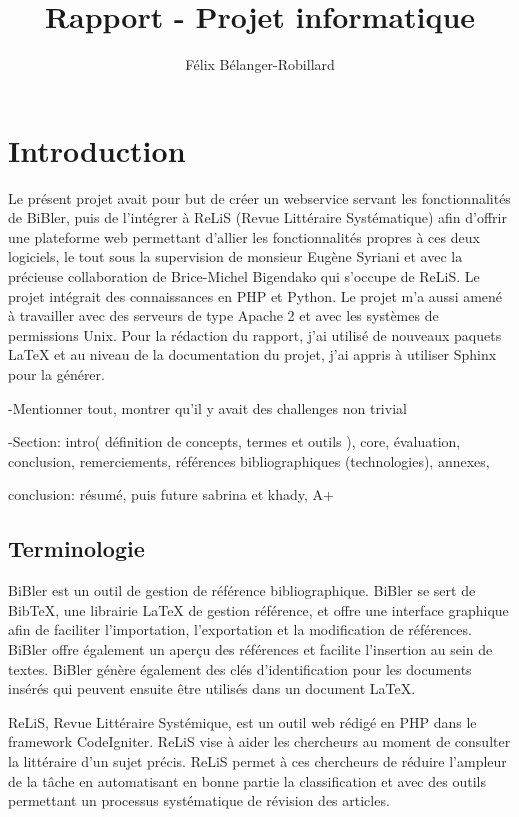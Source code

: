 \documentclass[12pt,titlepage]{article}
\author{Félix Bélanger-Robillard}
\title{Rapport - Projet informatique}
\let\oldsection\section
\renewcommand\section{\clearpage\oldsection}
\begin{document}
\maketitle

\tableofcontents
\newpage

\section{Introduction}
Le présent projet avait pour but de créer un webservice servant les fonctionnalités de BiBler, puis de l'intégrer à ReLiS (Revue Littéraire Systématique) afin d'offrir une plateforme web permettant d'allier les fonctionnalités propres à ces deux logiciels, le tout sous la supervision de monsieur Eugène Syriani et avec la précieuse collaboration de Brice-Michel Bigendako qui s'occupe de ReLiS. Le projet intégrait des connaissances en PHP et Python. Le projet m'a aussi amené à travailler avec des serveurs de type Apache 2 et avec les systèmes de permissions Unix. Pour la rédaction du rapport, j'ai utilisé de nouveaux paquets LaTeX et au niveau de la documentation du projet, j'ai appris à utiliser Sphinx pour la générer.  \newline


-Mentionner tout, montrer qu'il y avait des challenges non trivial

-Section: 
intro( définition de concepts, termes et outils ),
 core,
  évaluation,
   conclusion,
    remerciements,
     références bibliographiques (technologies),
      annexes, 

conclusion: résumé, puis future
sabrina et khady, A+
\subsection{Terminologie}
BiBler est un outil de gestion de référence bibliographique. BiBler se sert de BibTeX, une librairie LaTeX de gestion référence, et offre une interface graphique afin de faciliter l'importation, l'exportation et la modification de références. BiBler offre également un aperçu des références et facilite l'insertion au sein de textes. BiBler génère également des clés d'identification pour les documents insérés qui peuvent ensuite être utilisés dans un document LaTeX.  \newline

ReLiS, Revue Littéraire Systémique, est un outil web rédigé en PHP dans le framework CodeIgniter. ReLiS vise à aider les chercheurs au moment de consulter la littéraire d'un sujet précis. ReLiS permet à ces chercheurs de réduire l'ampleur de la tâche en automatisant en bonne partie la classification et avec des outils permettant un processus systématique de révision des articles. \newline
\end{document}
